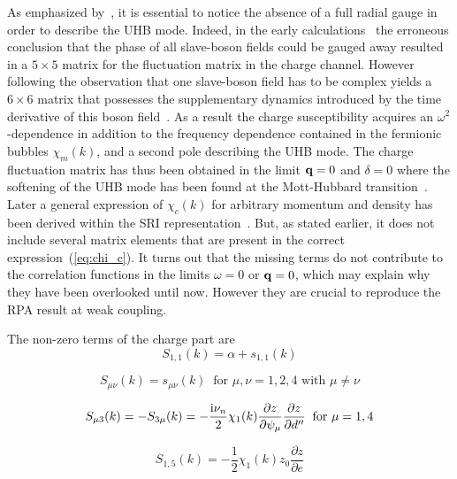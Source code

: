 \documentclass[showpacs,amsmath,twocolumn,floatfix]{revtex4-1}
\begin{document}
As emphasized by~\cite{Kot92,FW}, it is essential to notice the absence 
of a full radial gauge in order to describe the UHB mode. Indeed, in the 
early calculations~\cite{Ras88,Lav90,Lil90,li94} the erroneous conclusion that 
the phase of all slave-boson fields could be gauged away resulted in a 
$5 \times 5$ matrix for the fluctuation matrix in the charge channel. 
However following the observation that one slave-boson field has to be 
complex yields a $6 \times 6$ matrix that possesses the supplementary 
dynamics introduced by the time derivative of this boson field~\cite{Jol91}.
As a result the charge susceptibility acquires an $\omega^2$-dependence in
addition to the frequency dependence contained in the fermionic bubbles 
$\chi_m(k)$, and a second pole describing the UHB mode. The charge 
fluctuation matrix has thus been obtained in the limit ${\bf q}=0$ and 
$\delta=0$ where the softening of the UHB mode has been found at the 
Mott-Hubbard transition~\cite{Kot92}. Later a general expression of 
$\chi_c(k)$ for arbitrary momentum and density has been derived within 
the SRI representation~\cite{Zim97}. But, as stated earlier, it does not 
include several matrix elements that are present in the correct 
expression~(\ref{eq:chi_c}). It turns out that the missing terms do not 
contribute to the correlation functions in the limits $\omega=0$ or 
${\bf q}=0$, which may explain why they have been overlooked until now. 
However they are crucial to reproduce the RPA result at weak coupling.

The non-zero terms of the charge part are
\begin{equation}
S_{1,1}(k) = \alpha + s_{1,1}(k) \nonumber 
\end{equation}

\begin{equation}
S_{\mu\nu}(k)  = s_{\mu\nu}(k) \;\;  \text{for $\mu,\nu=1,2,4$ with $\mu\neq \nu$} 
\nonumber 
\end{equation}

\begin{equation}
S_{\mu 3}(k)  = -S_{3\mu}(k) = - \frac{{\rm i} \nu_n}{2}\chi_1(k) 
\frac{\partial z}{\partial \psi_{\mu}} \frac{\partial z}{\partial d''}  
\;\; \text{for $\mu=1,4$} \nonumber 
\end{equation}

\begin{equation}
S_{1,5}(k) = - \frac{1}{2} \chi_1(k) z_0 \frac{\partial z}{\partial e} \nonumber 
\end{equation}  
\end{document}

